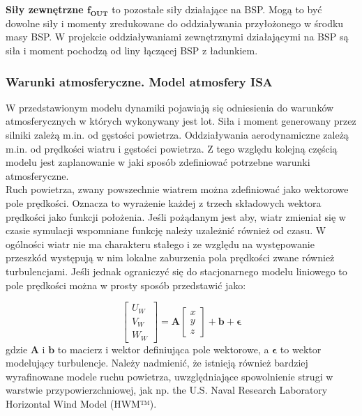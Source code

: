 \textbf{Siły zewnętrzne $\bm{f_{OUT}}$} to pozostałe siły działające na BSP. Mogą to być dowolne siły i momenty zredukowane do oddziaływania przyłożonego w środku masy BSP. W projekcie oddziaływaniami zewnętrznymi działającymi na BSP są siła i moment pochodzą od liny łączącej BSP z ładunkiem.

\subsubsection{Warunki atmosferyczne. Model atmosfery ISA}

W przedstawionym modelu dynamiki pojawiają się odniesienia do warunków atmosferycznych w których wykonywany jest lot. Siła i moment generowany przez silniki zależą m.in. od gęstości powietrza. Oddziaływania aerodynamiczne zależą m.in. od prędkości wiatru i gęstości powietrza. Z tego względu kolejną częścią modelu jest zaplanowanie w jaki sposób zdefiniować potrzebne warunki atmosferyczne.\\

Ruch powietrza, zwany powszechnie wiatrem można zdefiniować jako wektorowe pole prędkości. Oznacza to wyrażenie każdej z trzech składowych wektora prędkości jako funkcji położenia. Jeśli pożądanym jest aby, wiatr zmieniał się w czasie symulacji wspomniane funkcję należy uzależnić również od czasu. W ogólności wiatr nie ma charakteru stałego i ze względu na występowanie przeszkód występują w nim lokalne zaburzenia pola prędkości zwane również turbulencjami. Jeśli jednak ograniczyć się do stacjonarnego modelu liniowego to pole prędkości można w prosty sposób przedstawić jako:

\[
	\begin{bmatrix} U_W \\ V_W \\ W_W\end{bmatrix} = \bm{A} \begin{bmatrix} x \\ y \\ z\end{bmatrix}  + \bm{b} + \bm{\epsilon}
\]
gdzie $\bm{A}$ i $\bm{b}$ to macierz i wektor definiująca pole wektorowe, a $\bm{\epsilon}$ to wektor modelujący turbulencje. Należy nadmienić, że istnieją również bardziej wyrafinowane modele ruchu powietrza, uwzględniające spowolnienie strugi w warstwie przypowierzchniowej, jak np. the U.S. Naval Research Laboratory Horizontal Wind Model (HWM™).

